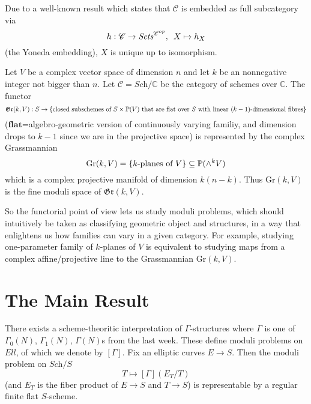 \documentclass[a4paper,11pt]{article}
\begin{document}
\begin{rem}
Due to a well-known result which states that $\mathcal{C}$ is embedded as full subcategory via
\[
h:\mathcal{C}\to\textit{Sets}^{\mathcal{C}^{op}}, \enskip X \mapsto h_X
\]
(the Yoneda embedding), $X$ is unique up to isomorphism.
\end{rem}

\begin{exm}
Let $V$ be a complex vector space of dimension $n$ and let $k$ be an nonnegative integer not bigger than $n$.
Let $\mathcal{C}=\textit{Sch}/\mathbb{C}$ be the category of schemes over $\mathbb{C}$.
The functor
\[
\mathfrak{Gr}(k,V):S\to\{\textnormal{closed subschemes of }S\times\mathbb{P}(V)\textnormal{ that are flat over $S$ with linear $(k-1)$-dimensional fibres}\}
\]
($\textbf{flat}$=algebro-geometric version of continuously varying familiy, and dimension drops to $k-1$ since we are in the projective space) is represented by the complex Grassmannian
\[
\textnormal{Gr}(k,V) = \{k\textnormal{-planes of }V\} \subseteq \mathbb{P}(\wedge^kV)
\]
which is a complex projective manifold of dimension $k(n-k)$.
Thus Gr$(k,V)$ is the fine moduli space of $\mathfrak{Gr}(k,V)$.
\end{exm}

So the functorial point of view lets us study moduli problems, which should intuitively be taken as classifying geometric object and structures, in a way that enlightens us how families can vary in a given category.
For example, studying one-parameter family of $k$-planes of $V$ is equivalent to studying maps from a complex affine/projective line to the Grassmannian Gr$(k,V)$.

\section{The Main Result}

\begin{thm}
There exists a scheme-theoritic interpretation of $\Gamma$-structures where $\Gamma$ is one of $\Gamma_0(N)$, $\Gamma_1(N)$, $\Gamma(N)$s from the last week.
These define moduli problems on $Ell$, of which we denote by $[\Gamma]$.
Fix an elliptic curves $E\to$$S$.
Then the moduli problem on $\textit{Sch}/S$
\[
T \mapsto [\Gamma](E_T/T)
\]
(and $E_T$ is the fiber product of $E\to$$S$ and $T\to$$S$) is representable by a regular finite flat $S$-scheme.
\end{thm}
\end{document}
